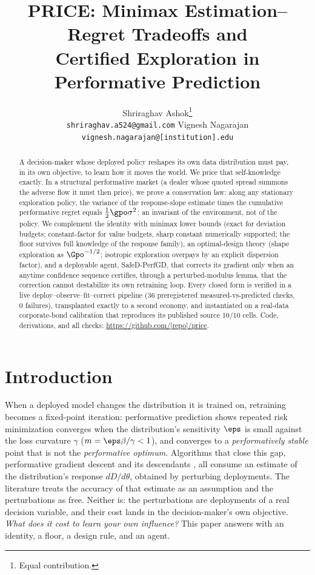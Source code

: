 \documentclass{article}
\title{PRICE: Minimax Estimation--Regret Tradeoffs and\\ Certified Exploration in Performative Prediction}
\author{%
  Shriraghav Ashok\thanks{Equal contribution.} \\
  \texttt{shriraghav.a524@gmail.com}
  \And
  Vignesh Nagarajan\footnotemark[1] \\
  \texttt{vignesh.nagarajan@[institution].edu}
}
\begin{document}
\maketitle

\begin{abstract}
A decision-maker whose deployed policy reshapes its own data distribution must pay, in its own objective, to learn how it moves the world. We price that self-knowledge exactly. In a structural performative market (a dealer whose quoted spread summons the adverse flow it must then price), we prove a conservation law: along any stationary exploration policy, the variance of the response-slope estimate times the cumulative performative regret equals $\tfrac{1}{2}\gpo\sigma^2$: an invariant of the environment, not of the policy. We complement the identity with minimax lower bounds (exact for deviation budgets; constant-factor for value budgets, sharp constant numerically supported; the floor survives full knowledge of the response family), an optimal-design theory (shape exploration as $\Gpo^{-1/2}$; isotropic exploration overpays by an explicit dispersion factor), and a deployable agent, SafeD-PerfGD, that corrects its gradient only when an anytime confidence sequence certifies, through a perturbed-modulus lemma, that the correction cannot destabilize its own retraining loop. Every closed form is verified in a live deploy--observe--fit--correct pipeline (36 preregistered measured-vs-predicted checks, 0 failures), transplanted exactly to a second economy, and instantiated on a real-data corporate-bond calibration that reproduces its published source 10/10 cells. Code, derivations, and all checks: \url{https://github.com/[repo]/price}.
\end{abstract}

\section{Introduction}
\label{sec:intro}

When a deployed model changes the distribution it is trained on, retraining becomes a fixed-point iteration: performative prediction \citep{perdomo2020performative,hardt2023performative} shows repeated risk minimization converges when the distribution's sensitivity $\eps$ is small against the loss curvature $\gamma$ ($m = \eps\beta/\gamma < 1$), and converges to a \emph{performatively stable} point that is not the \emph{performative optimum}. Algorithms that close this gap, performative gradient descent and its descendants \citep{izzo2021learn,miller2021outside,mendler2020stochastic,drusvyatskiy2022stochastic,li2022state,brown2022performative}, all consume an estimate of the distribution's response $dD/d\theta$, obtained by perturbing deployments. The literature treats the accuracy of that estimate as an assumption and the perturbations as free. Neither is: the perturbations are deployments of a real decision variable, and their cost lands in the decision-maker's own objective. \emph{What does it cost to learn your own influence?} This paper answers with an identity, a floor, a design rule, and an agent.
\end{document}

